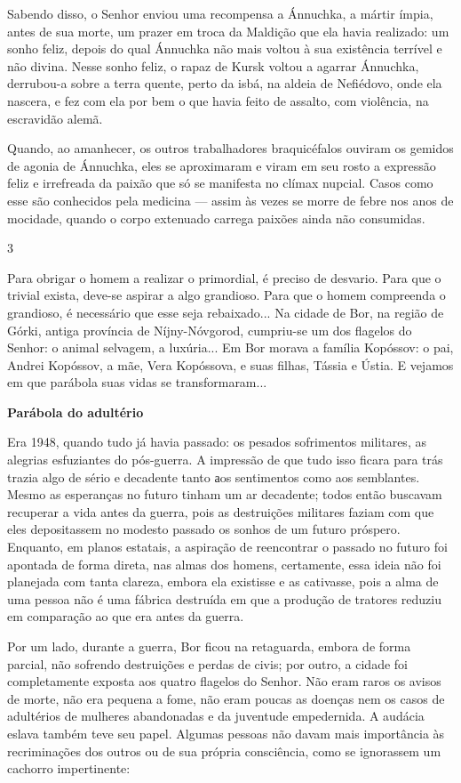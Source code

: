 Sabendo disso, o Senhor enviou uma recompensa a Ánnuchka, a mártir
ímpia, antes de sua morte, um prazer em troca da Maldição que ela havia
realizado: um sonho feliz, depois do qual Ánnuchka não mais voltou à sua
existência terrível e não divina. Nesse sonho feliz, o rapaz de Kursk
voltou a agarrar Ánnuchka, derrubou-a sobre a terra quente, perto da
isbá, na aldeia de Nefiédovo, onde ela nascera, e fez com ela por bem o
que havia feito de assalto, com violência, na escravidão alemã.

Quando, ao amanhecer, os outros trabalhadores braquicéfalos ouviram os
gemidos de agonia de Ánnuchka, eles se aproximaram e viram em seu rosto
a expressão feliz e irrefreada da paixão que só se manifesta no clímax
nupcial. Casos como esse são conhecidos pela medicina --- assim às vezes
se morre de febre nos anos de mocidade, quando o corpo extenuado carrega
paixões ainda não consumidas.

3

Para obrigar o homem a realizar o primordial, é preciso de desvario.
Para que o trivial exista, deve-se aspirar a algo grandioso. Para que o
homem compreenda o grandioso, é necessário que esse seja rebaixado... Na
cidade de Bor, na região de Górki, antiga província de Níjny-Nóvgorod,
cumpriu-se um dos flagelos do Senhor: o animal selvagem, a luxúria... Em
Bor morava a família Kopóssov: o pai, Andrei Kopóssov, a mãe, Vera
Kopóssova, e suas filhas, Tássia e Ústia. E vejamos em que parábola suas
vidas se transformaram...

\textbf{Parábola do adultério}

Era 1948, quando tudo já havia passado: os pesados sofrimentos
militares, as alegrias esfuziantes do pós-guerra. A impressão de que
tudo isso ficara para trás trazia algo de sério e decadente tanto аos
sentimentos como aos semblantes. Mesmo as esperanças no futuro tinham um
ar decadente; todos então buscavam recuperar a vida antes da guerra,
pois as destruições militares faziam com que eles depositassem no
modesto passado os sonhos de um futuro próspero. Enquanto, em planos
estatais, a aspiração de reencontrar o passado no futuro foi apontada de
forma direta, nas almas dos homens, certamente, essa ideia não foi
planejada com tanta clareza, embora ela existisse e as cativasse, pois a
alma de uma pessoa não é uma fábrica destruída em que a produção de
tratores reduziu em comparação ao que era antes da guerra.

Por um lado, durante a guerra, Bor ficou na retaguarda, embora de forma
parcial, não sofrendo destruições e perdas de civis; por outro, a cidade
foi completamente exposta aos quatro flagelos do Senhor. Não eram raros
os avisos de morte, não era pequena a fome, não eram poucas as doenças
nem os casos de adultérios de mulheres abandonadas e da juventude
empedernida. A audácia eslava também teve seu papel. Algumas pessoas não
davam mais importância às recriminações dos outros ou de sua própria
consciência, como se ignorassem um cachorro impertinente:

